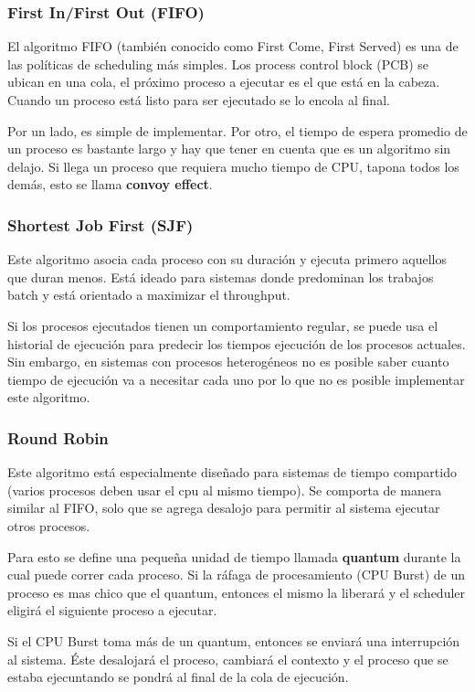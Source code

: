 	\subsubsection{First In/First Out (FIFO)}
	El algoritmo FIFO (también conocido como First Come, First Served) es una de las políticas de scheduling más simples. Los process control block (PCB) se ubican en una cola, el próximo proceso a ejecutar es el que está en la cabeza. Cuando un proceso está listo para ser ejecutado se lo encola al final.
	
	Por un lado, es simple de implementar. Por otro, el tiempo de espera promedio de un proceso es bastante largo y hay que tener en cuenta que es un algoritmo sin delajo. Si llega un proceso que requiera mucho tiempo de CPU, tapona todos los demás, esto se llama \textbf{convoy effect}.
	
	\subsubsection{Shortest Job First (SJF)}
	Este algoritmo asocia cada proceso con su duración y ejecuta primero aquellos que duran menos. Está ideado para sistemas donde predominan los trabajos batch y está orientado a maximizar el throughput.
	
	Si los procesos ejecutados tienen un comportamiento regular, se puede usa el historial de ejecución para predecir los tiempos ejecución de los procesos actuales. Sin embargo, en sistemas con procesos heterogéneos no es posible saber cuanto tiempo de ejecución va a necesitar cada uno por lo que no es posible implementar este algoritmo.
	
	\subsubsection{Round Robin}
	Este algoritmo está especialmente diseñado para sistemas de tiempo compartido (varios procesos deben usar el cpu al mismo tiempo). Se comporta de manera similar al FIFO, solo que se agrega desalojo para permitir al sistema ejecutar otros procesos.
	
	Para esto se define una pequeña unidad de tiempo llamada \textbf{quantum} durante la cual puede correr cada proceso. Si la ráfaga de procesamiento (CPU Burst) de un proceso es mas chico que el quantum, entonces el mismo la liberará y el scheduler eligirá el siguiente proceso a ejecutar.
	
	Si el CPU Burst toma más de un quantum, entonces se enviará una interrupción al sistema. Éste desalojará el proceso, cambiará el contexto y el proceso que se estaba ejecuntando se pondrá al final de la cola de ejecución.
	
